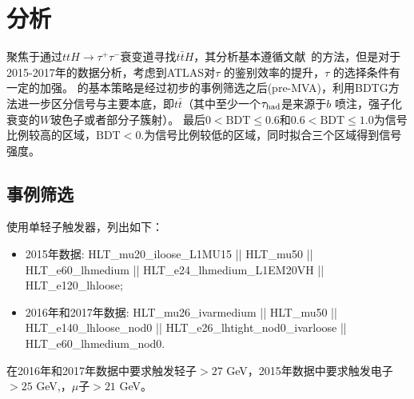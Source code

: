 \section{\ltwotau 分析}\label{sec:1l2tau}
\ltwotau 聚焦于通过$ttH\rightarrow \tau^+\tau^-$衰变道寻找$t\bar{t}H$，其分析基本遵循文献~\cite{Aaboud:2017jvq}的方法，但是对于2015-2017年的数据分析，考虑到ATLAS对$\tau$ 的鉴别效率的提升，$\tau$ 的选择条件有一定的加强。
\ltwotau 的基本策略是经过初步的事例筛选之后(pre-MVA)，利用BDTG\cite{Hocker:2007ht}方法进一步区分信号与主要本底，即$t\bar{t}$（其中至少一个$\tau_{\text{had}}$是来源于$b$ 喷注，强子化衰变的$W$玻色子或者部分子簇射）。
最后$0<\text{BDT}\le 0.6$和$0.6<\text{BDT}\le 1.0$为信号比例较高的区域，$\text{BDT}<0.$为信号比例较低的区域，同时拟合三个区域得到信号强度。

\subsection{事例筛选}
\ltwotau 使用单轻子触发器，列出如下：
\begin{itemize}
\item 2015年数据: HLT\_mu20\_iloose\_L1MU15 || HLT\_mu50 || HLT\_e60\_lhmedium || 
 HLT\_e24\_lhmedium\_L1EM20VH || HLT\_e120\_lhloose;
\item 2016年和2017年数据: HLT\_mu26\_ivarmedium || HLT\_mu50 || HLT\_e140\_lhloose\_nod0 || 
HLT\_e26\_lhtight\_nod0\_ivarloose || HLT\_e60\_lhmedium\_nod0.\\
\end{itemize}
在2016年和2017年数据中要求触发轻子\pT$>27$ GeV，2015年数据中要求触发电子\pt$>25$ GeV,，$\mu$子\pt$>21$ GeV。

